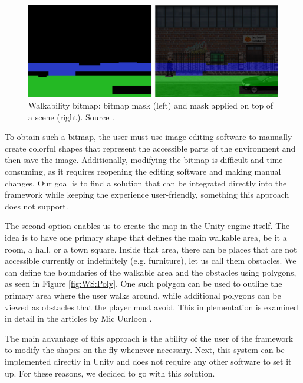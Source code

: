 \begin{figure}[H]
\centering
\includegraphics[width=1.0\linewidth]{img/walkability-map2.png}
\caption{Walkability bitmap: bitmap mask (left) and mask applied on top of a scene (right). Source \cite{Shdon}.}
\label{fig:WS:Bitmap}
\end{figure}

To obtain such a bitmap, the user must use image-editing software to manually create colorful shapes that represent the accessible parts of the environment and then save the image. Additionally, modifying the bitmap is difficult and time-consuming, as it requires reopening the editing software and making manual changes. Our goal is to find a solution that can be integrated directly into the framework while keeping the experience user-friendly, something this approach does not support. 

The second option enables us to create the map in the Unity engine itself. The idea is to have one primary shape that defines the main walkable area, be it a room, a hall, or a town square. Inside that area, there can be places that are not accessible currently or indefinitely (e.g. furniture), let us call them obstacles. We can define the boundaries of the walkable area and the obstacles using polygons, as seen in Figure \ref{fig:WS:Poly}. One such polygon can be used to outline the primary area where the user walks around, while additional polygons can be viewed as obstacles that the player must avoid. This implementation is examined in detail in the articles by Mic Uurloon \cite{Uurloon1}\cite{Uurloon2}.

The main advantage of this approach is the ability of the user of the framework to modify the shapes on the fly whenever necessary. Next, this system can be implemented directly in Unity and does not require any other software to set it up. For these reasons, we decided to go with this solution.

